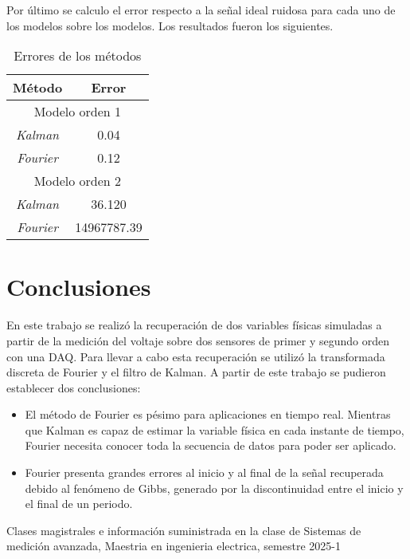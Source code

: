 \documentclass[conference]{IEEEtran}
\begin{document}
Por \'ultimo se calculo el error respecto a la se\~nal ideal ruidosa para cada uno de los modelos sobre los modelos. Los resultados fueron los siguientes.

\begin{table}[h]
	\centering
	\caption{Errores de los m\'etodos}
	\label{tab:errores}
	\begin{tabular}{|c|c|}
		\hline
		
		\textbf{M\'etodo} & \textbf{Error} \\
		\hline
		\multicolumn{2}{|c|}{Modelo orden 1} \\
		\hline
		\textit{Kalman}  &  0.04 \\
		\textit{Fourier} & 0.12 \\
		\hline
		\multicolumn{2}{|c|}{Modelo orden 2} \\
		\hline
		\textit{Kalman}  &  36.120 \\
		\textit{Fourier} & 14967787.39 \\
		\hline
	\end{tabular}
	
\end{table}

\section{Conclusiones}

En este trabajo se realizó la recuperación de dos variables físicas simuladas a partir de la medición del voltaje sobre dos sensores de primer y segundo orden con una DAQ. Para llevar a cabo esta recuperación se utilizó la transformada discreta de Fourier
y el filtro de Kalman. A partir de este trabajo se pudieron establecer dos conclusiones:

\begin{itemize}
	\item El método de Fourier es pésimo para aplicaciones en tiempo real. Mientras que Kalman es capaz de estimar la variable física en cada instante de tiempo, Fourier necesita conocer toda la secuencia de datos para poder ser aplicado.
	\item Fourier presenta grandes errores al inicio y al final de la señal recuperada debido al fenómeno de Gibbs, generado por la discontinuidad entre el inicio y el final de un periodo.
\end{itemize}


\begin{thebibliography}{00}

	\item Clases magistrales e información suministrada en la clase de Sistemas de medición avanzada, Maestria en ingenieria electrica, semestre 2025-1

\end{thebibliography}
\end{document}

